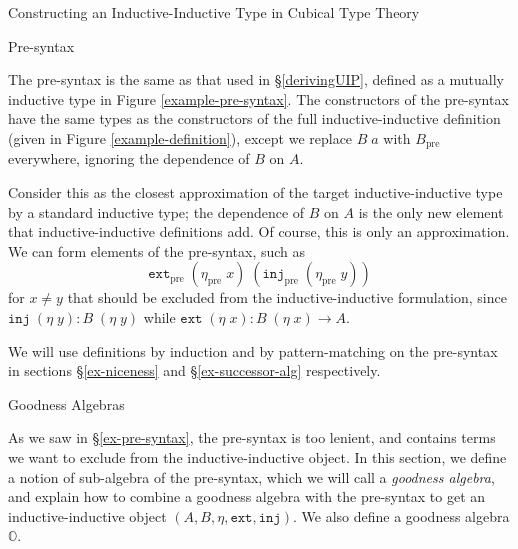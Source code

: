 \documentclass[runningheads]{llncs}
\newcommand{\erase}[1]{{}}
\newcommand{\pre}[1]{{#1}_\text{pre}}
\newcommand{\bbO}{\mathbb{O}}
\newcommand{\join}{\texttt{ext}}
\newcommand{\inj}{\texttt{inj}}
\begin{document}
\begin{section}{Constructing an Inductive-Inductive Type in Cubical Type Theory}
\erase{We will follow the same sequence of steps in \S\ref{construct-cubical}, where we perform the construction for arbitrary inductive-inductive definitions.}

\begin{subsection}{Pre-syntax}\label{ex-pre-syntax}

The pre-syntax is the same as that used in \S\ref{derivingUIP}, defined as a mutually inductive type in Figure \ref{example-pre-syntax}. The constructors of the pre-syntax have the same types as the constructors of the full inductive-inductive definition (given in Figure \ref{example-definition}), except we replace $B\;a$ with $\pre{B}$ everywhere, ignoring the dependence of $B$ on $A$.

Consider this as the closest approximation of the target inductive-inductive type by a standard inductive type; the dependence of $B$ on $A$ is the only new element that inductive-inductive definitions add. Of course, this is only an approximation. We can form elements of the pre-syntax, such as \[\pre{\join}\;(\pre{\eta}\;x)\;(\pre{\inj}\;(\pre{\eta}\;y))\] for $x \neq y$ that should be excluded from the inductive-inductive formulation, since $\inj\;(\eta\;y) : B\;(\eta\;y)$ while $\join\;(\eta\;x) : B\;(\eta\;x) \to A$.

We will use definitions by induction and by pattern-matching on the pre-syntax in sections \S\ref{ex-niceness} and \S\ref{ex-successor-alg} respectively.

\end{subsection}

\begin{subsection}{Goodness Algebras}\label{ex-goodness-algebra}

As we saw in \S\ref{ex-pre-syntax}, the pre-syntax is too lenient, and contains terms we want to exclude from the inductive-inductive object. In this section, we define a notion of sub-algebra of the pre-syntax, which we will call a \emph{goodness algebra}, and explain how to combine a goodness algebra with the pre-syntax to get an inductive-inductive object $(A, B, \eta, \join, \inj)$. We also define a goodness algebra $\bbO$.\erase{ In \S\ref{ex-niceness}, we will describe a property (niceness) of goodness algebras such that the resulting inductive-inductive object satisfies the simple elimination rules, and in \S\ref{ex-limit-alg}, we will define a specific goodness algebra which is nice.}

\begin{figure}[htb]\begin{flushleft}


\end{flushleft}
\end{figure}
\end{subsection}
\end{section}
\end{document}
